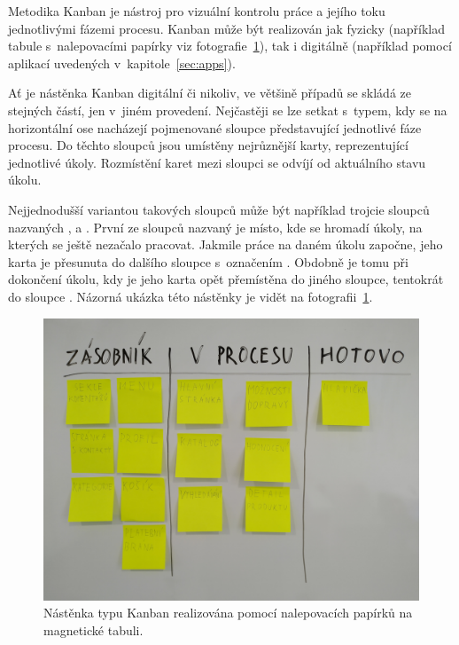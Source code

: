 Metodika Kanban je nástroj pro vizuální kontrolu práce a jejího toku jednotlivými fázemi procesu. Kanban může být realizován jak fyzicky (například tabule s~nalepovacími papírky viz fotografie~\ref{img:kanban-whiteboard}), tak i digitálně (například pomocí aplikací uvedených v~kapitole~\ref{sec:apps}). 

Ať je nástěnka Kanban digitální či nikoliv, ve většině případů se skládá ze stejných částí, jen v~jiném provedení. Nejčastěji se lze setkat s~typem, kdy se na horizontální ose nacházejí pojmenované sloupce představující jednotlivé fáze procesu. Do těchto sloupců jsou umístěny nejrůznější karty, reprezentující jednotlivé úkoly. Rozmístění karet mezi sloupci se odvíjí od aktuálního stavu úkolu.

Nejjednodušší variantou takových sloupců může být například trojcie sloupců nazvaných ,  a . První ze sloupců nazvaný  je místo, kde se hromadí úkoly, na kterých se ještě nezačalo pracovat. Jakmile práce na daném úkolu započne, jeho karta je přesunuta do dalšího sloupce s~označením . Obdobně je tomu při dokončení úkolu, kdy je jeho karta opět přemístěna do jiného sloupce, tentokrát do sloupce . Názorná ukázka této nástěnky je vidět na fotografii~\ref{img:kanban-whiteboard}.

\begin{figure}[H]
	\centering
	\includegraphics[width=\textwidth]{obrazky-figures/kanban-sticky-note}
	\caption{Nástěnka typu Kanban realizována pomocí nalepovacích papírků na magnetické tabuli.}
	\label{img:kanban-whiteboard}
\end{figure}

